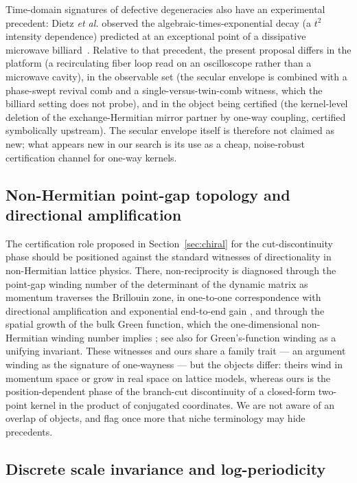 \documentclass[11pt,a4paper]{article}
\begin{document}
Time-domain signatures of defective degeneracies also have an experimental
precedent: Dietz \emph{et al.} observed the algebraic-times-exponential decay
(a $t^{2}$ intensity dependence) predicted at an exceptional point of a
dissipative microwave billiard~\cite{Dietz2007}. Relative to that precedent,
the present proposal differs in the platform (a recirculating fiber loop read
on an oscilloscope rather than a microwave cavity), in the observable set (the
secular envelope is combined with a phase-swept revival comb and a
single-versus-twin-comb witness, which the billiard setting does not
probe), and in the object being certified (the kernel-level deletion of the
exchange-Hermitian mirror partner by one-way coupling, certified symbolically
upstream). The secular envelope itself is therefore not claimed as new; what appears
new in our search is its use as a cheap, noise-robust certification channel
for one-way kernels.

\subsection{Non-Hermitian point-gap topology and directional amplification}
\label{sec:nhtopo}

The certification role proposed in Section~\ref{sec:chiral} for the
cut-discontinuity phase should be positioned against the standard
witnesses of directionality in non-Hermitian lattice physics. There,
non-reciprocity is diagnosed through the point-gap winding number of the
determinant of the dynamic matrix as momentum traverses the Brillouin
zone, in one-to-one correspondence with directional amplification and
exponential end-to-end gain \cite{Wanjura2020}, and through the spatial
growth of the bulk Green function, which the one-dimensional
non-Hermitian winding number implies \cite{Zirnstein2021}; see
also \cite{HuWang2023} for Green's-function winding as a unifying
invariant. These witnesses and ours share a family trait --- an argument
winding as the signature of one-wayness --- but the objects differ:
theirs wind in momentum space or grow in real space on lattice models,
whereas ours is the position-dependent phase of the branch-cut
discontinuity of a closed-form two-point kernel in the product of
conjugated coordinates. We are not aware of an overlap of objects, and
flag once more that niche terminology may hide precedents.

\subsection{Discrete scale invariance and log-periodicity}
\label{sec:dsi}
\end{document}
